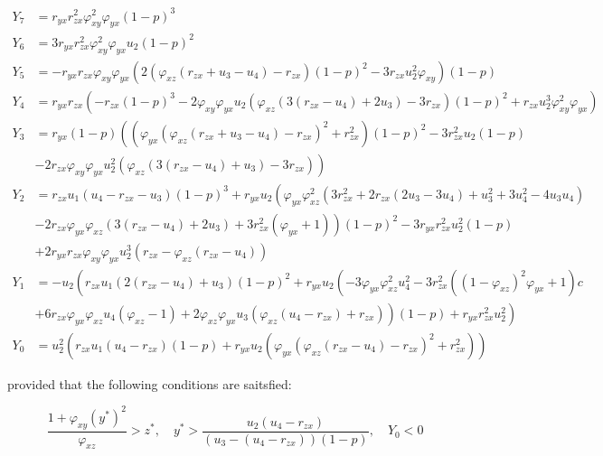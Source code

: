 \begin{theorem}
    \begin{align*}
        Y_7 &= r_{yx}r_{zx}^2\varphi_{xy}^2\varphi_{yx}\left(1-p\right)^3\\
        Y_6 &= 3r_{yx}r_{zx}^2\varphi_{xy}^2\varphi_{yx}u_2\left(1-p\right)^2\\
        Y_5 &= -r_{yx}r_{zx}\varphi_{xy}\varphi_{yx}\left(2\left(\varphi_{xz}\left(r_{zx}+u_3-u_4\right)-r_{zx}\right)\left(1-p\right)^2-3r_{zx}u_2^2\varphi_{xy}\right)\left(1-p\right)\\
        Y_4 &= r_{yx}r_{zx}\left(-r_{zx}\left(1-p\right)^3-2\varphi_{xy}\varphi_{yx}u_2\left(\varphi_{xz}\left(3\left(r_{zx}-u_4\right)+2u_3\right)-3r_{zx}\right)\left(1-p\right)^2+r_{zx}u_2^3\varphi_{xy}^2\varphi_{yx}\right)\\
        Y_3 &= r_{yx}\left(1-p\right)\left(\left(\varphi_{yx}\left(\varphi_{xz}\left(r_{zx}+u_3-u_4\right)-r_{zx}\right)^2+r_{zx}^2\right)\left(1-p\right)^2-3r_{zx}^2u_2\left(1-p\right)\right.\\
        &\left.-2r_{zx}\varphi_{xy}\varphi_{yx}u_2^2\left(\varphi_{xz}\left(3\left(r_{zx}-u_4\right)+u_3\right)-3r_{zx}\right)\right)\\
        Y_2 &= r_{zx}u_1\left(u_4-r_{zx}-u_3\right)\left(1-p\right)^3+r_{yx}u_2\left(\varphi_{yx}\varphi_{xz}^2\left(3r_{zx}^2+2r_{zx}\left(2u_3-3u_4\right)+u_3^2+3u_4^2-4u_3u_4\right)\right.\\
        &\left.-2r_{zx}\varphi_{yx}\varphi_{xz}\left(3\left(r_{zx}-u_4\right)+2u_3\right)+3r_{zx}^2\left(\varphi_{yx}+1\right)\right)\left(1-p\right)^2-3r_{yx}r_{zx}^2u_2^2\left(1-p\right)\\
        &+2r_{yx}r_{zx}\varphi_{xy}\varphi_{yx}u_2^3\left(r_{zx}-\varphi_{xz}\left(r_{zx}-u_4\right)\right)\\
        Y_1 &= -u_2\left(r_{zx}u_1\left(2\left(r_{zx}-u_4\right)+u_3\right)\left(1-p\right)^2+r_{yx}u_2\left(-3\varphi_{yx}\varphi_{xz}^2u_4^2-3r_{zx}^2\left(\left(1-\varphi_{xz}\right)^2\varphi_{yx}+1\right)\right.c \right.\\
        &\left.\left.+6r_{zx}\varphi_{yx}\varphi_{xz}u_4\left(\varphi_{xz}-1\right)+2\varphi_{xz}\varphi_{yx}u_3\left(\varphi_{xz}\left(u_4-r_{zx}\right)+r_{zx}\right)\right)\left(1-p\right)+r_{yx}r_{zx}^2u_2^2 \right)\\
        Y_0 &= u_2^2\left(r_{zx}u_1\left(u_4-r_{zx}\right)\left(1-p\right)+r_{yx}u_2\left(\varphi_{yx}\left(\varphi_{xz}\left(r_{zx}-u_4\right)-r_{zx}\right)^2+r_{zx}^2\right)\right)
    \end{align*}

    provided that the following conditions are saitsfied:
    
    \begin{equation*}
        \frac{1+\varphi_{xy}\left(y^*\right)^2}{\varphi_{xz}}>z^*,\quad
        y^*>\frac{u_2\left(u_4-r_{zx}\right)}{\left(u_3-\left(u_4-r_{zx}\right)\right)\left(1-p\right)},\quad
        Y_0 < 0
    \end{equation*}
\end{theorem}
